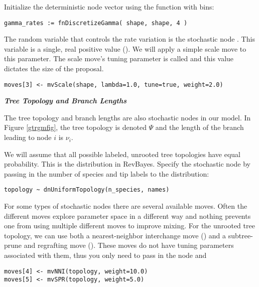 Initialize the  deterministic node vector using the   function with  bins:
{\tt \begin{snugshade*}
\begin{lstlisting}
gamma_rates := fnDiscretizeGamma( shape, shape, 4 )
\end{lstlisting}
\end{snugshade*}}



The random variable that controls the rate variation is the stochastic node . This variable is a single, real positive value (). 
We will apply a simple scale move to this parameter.
The scale move's tuning parameter is called  and this value dictates the size of the proposal.
{\tt \begin{snugshade*}
\begin{lstlisting}
moves[3] <- mvScale(shape, lambda=1.0, tune=true, weight=2.0)\end{lstlisting}
\end{snugshade*}}


\textbf{\textit{Tree Topology and Branch Lengths}}

The tree topology and branch lengths are also stochastic nodes in our model. 
In Figure \ref{gtrgmfig}, the tree topology is denoted $\Psi$ and the length of the branch leading to node $i$ is $\nu_i$.

We will assume that all possible labeled, unrooted tree topologies have equal probability. This is the  distribution in RevBayes. Specify the  stochastic node by passing in the number of species  and tip labels  to the  distribution:
{\tt \begin{snugshade*}
\begin{lstlisting}
topology ~ dnUniformTopology(n_species, names)
\end{lstlisting}
\end{snugshade*}}

For some types of stochastic nodes there are several available moves. 
Often the different moves explore parameter space in a different way and nothing prevents one from using multiple different moves to improve mixing. 
For the unrooted tree topology, we can use both a nearest-neighbor interchange move () and a subtree-prune and regrafting move (). These moves do not have tuning parameters associated with them, thus you only need to pass in the  node and  
{\tt \begin{snugshade*}
\begin{lstlisting}
moves[4] <- mvNNI(topology, weight=10.0)
moves[5] <- mvSPR(topology, weight=5.0)
\end{lstlisting}
\end{snugshade*}}


